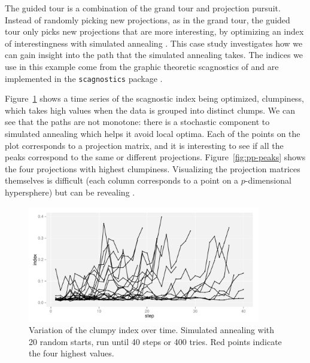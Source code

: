 \documentclass[preprint]{imsart}
\begin{document}
The guided tour \citep{cook:1995} is a combination of the grand tour and projection pursuit.  Instead of randomly picking new projections, as in the grand tour, the guided tour only picks new projections that are more interesting, by optimizing an index of interestingness with simulated annealing \citep{kirkpatrick:1983}.  This case study investigates how we can gain insight into the path that the simulated annealing takes. The indices we use in this example come from the graphic theoretic scagnostics of \citet{wilkinson:2005} and are implemented in the {\tt scagnostics} package \citep{scagnostics}.

Figure~\ref{fig:pp-timeseries} shows a time series of the scagnostic index being optimized, clumpiness, which takes high values when the data is grouped into distinct clumps.   We can see that the paths are not monotone: there is a stochastic component to simulated annealing which helps it avoid local optima.  Each of the points on the plot corresponds to a projection matrix, and it is interesting to see if all the peaks correspond to the same or different projections.  Figure~\ref{fig:pp-peaks} shows the four projections with highest clumpiness.  Visualizing the projection matrices themselves is difficult (each column corresponds to a point on a $p$-dimensional hypersphere) but can be revealing \citep{cook:2006}.

\begin{figure}[htbp]
  \centering
  \includegraphics[width=4in]{pp-index-progression}
  \caption{Variation of the clumpy index over time.  Simulated annealing with 20 random starts, run until 40 steps or 400 tries.  Red points indicate the four highest values.}
  \label{fig:pp-timeseries}
\end{figure}
\end{document}
